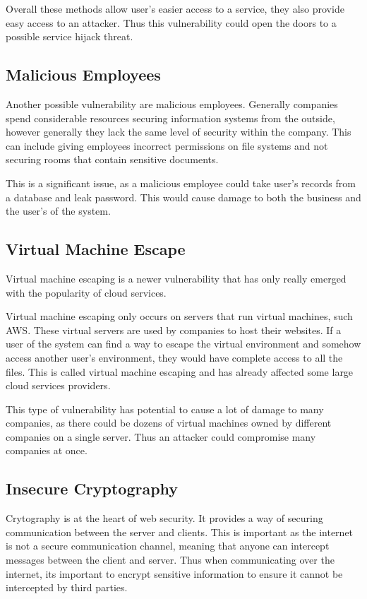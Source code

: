 Overall these methods allow user's easier access to a service, they also provide easy access to an attacker. Thus this vulnerability could open the doors to a possible service hijack threat.

\subsection{Malicious Employees}

Another possible vulnerability are malicious employees. Generally companies spend considerable resources securing information systems from the outside, however generally they lack the same level of security within the company. This can include giving employees incorrect permissions on file systems and not securing rooms that contain sensitive documents.

This is a significant issue, as a malicious employee could take user's records from a database and leak password. This would cause damage to both the business and the user's of the system.

\subsection{Virtual Machine Escape}

Virtual machine escaping is a newer vulnerability that has only really emerged with the popularity of cloud services\cite{ramachandran_recommendations_2014}.

Virtual machine escaping only occurs on servers that run virtual machines, such AWS\cite{aws_amazon_2016}. These virtual servers are used by companies to host their websites. If a user of the system can find a way to escape the virtual environment and somehow access another user's environment, they would have complete access to all the files. This is called virtual machine escaping and has already affected some large cloud services providers\cite{cloudstrike_venom_2016}.

This type of vulnerability has potential to cause a lot of damage to many companies, as there could be dozens of virtual machines owned by different companies on a single server. Thus an attacker could compromise many companies at once.

\subsection{Insecure Cryptography}

Crytography is at the heart of web security. It provides a way of securing communication between the server and clients. This is important as the internet is not a secure communication channel\cite{nisha_overview_2010}, meaning that anyone can intercept messages between the client and server. Thus when communicating over the internet, its important to encrypt sensitive information to ensure it cannot be intercepted by third parties.

